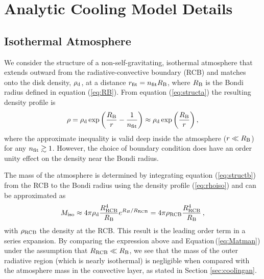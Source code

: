 \documentclass[apj, numberedappendix]{emulateapj}
\newcommand{\Eq}[1]{Equation\,(\ref{#1})}
\newcommand{\RB}{R_{\rm B}}
\newcommand{\co}{_{\rm c}}
\newcommand{\di}{_{\rm d}}
\newcommand{\cb}{_{\rm RCB}}
\begin{document}
\section{Analytic Cooling Model Details}\label{sec:analytic}

\subsection{Isothermal Atmosphere}
\label{iso}

We consider the structure of a non-self-gravitating, isothermal atmosphere that extends outward from the radiative-convective boundary (RCB) and matches onto the disk density, $\rho_{\rm d}$, at a distance $r_{\rm fit} = n_{\rm fit} \RB$, where $R_{\rm B}$ is the Bondi radius defined in equation (\ref{eq:RB}). From equation (\ref{eq:structa}) the resulting density profile is
\begin{equation} \label{eq:rhoiso}
\rho = \rho_{\rm d} \exp \left({R_{\rm B} \over r} - {1 \over n_{\rm{fit}}} \right) \approx   \rho_{\rm{d}} \exp \left(R_{\rm B} \over r  \right),
\end{equation} 
where the approximate inequality is valid deep inside the atmosphere ($r \ll \RB$) for any $n_{\rm fit} \gtrsim 1$.  However, the choice of boundary condition does have an order unity effect on the density near the Bondi radius. 

The mass of the atmosphere is determined by integrating equation (\ref{eq:structb}) from the RCB to the Bondi radius using the density profile (\ref{eq:rhoiso}) and can be approximated as
\begin{equation} \label{eq:MatmISO}
M_{\rm iso} \approx 4 \pi \rho\di {R\cb^4 \over R_{\rm B}} e^{R_B/R\cb} = 4\pi \rho\cb \frac{R\cb^4}{R_{\rm B}} \, ,
\end{equation}
with $\rho\cb$ the density at the RCB.
This result is the leading order term in a series expansion. By comparing the expression above and \Eq{eq:Matman} under the assumption that $R\cb \ll R_{\rm B}$, we see that the mass of the outer radiative region (which is nearly isothermal) is negligible when compared with the atmosphere mass in the convective layer, as stated in Section \ref{sec:coolingan}.
\end{document}
